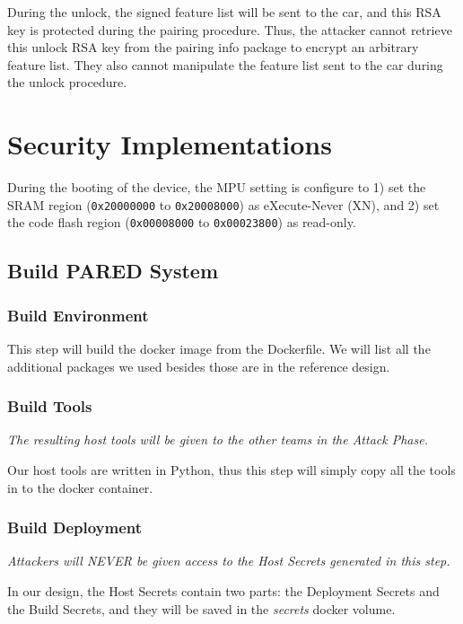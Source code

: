 \documentclass[11pt,oneside,onecolumn,letterpaper]{article}
\begin{document}
During the unlock, the signed feature list will be sent to the car, and this RSA key is protected during the pairing procedure.
Thus, the attacker cannot retrieve this unlock RSA key from the pairing info package to encrypt an arbitrary feature list.
They also cannot manipulate the feature list sent to the car during the unlock procedure.


\section{Security Implementations}

During the booting of the device, the MPU setting is configure to 1) set the SRAM region (\verb|0x20000000| to \verb|0x20008000|) as eXecute-Never (XN), and 2) set the code flash region (\verb|0x00008000| to \verb|0x00023800|) as read-only.

\subsection{Build PARED System}

\subsubsection{Build Environment}

This step will build the docker image from the Dockerfile. We will list all the additional packages we used besides those are in the reference design.

\subsubsection{Build Tools}

\textit{The resulting host tools will be given to the other teams in the Attack Phase.}

Our host tools are written in Python, thus this step will simply copy all the tools in to the docker container.

\subsubsection{Build Deployment}

\textit{Attackers will NEVER be given access to the Host Secrets generated in this step.}

In our design, the Host Secrets contain two parts: the Deployment Secrets and the Build Secrets, and they will be saved in the \textit{secrets} docker volume.
\end{document}
